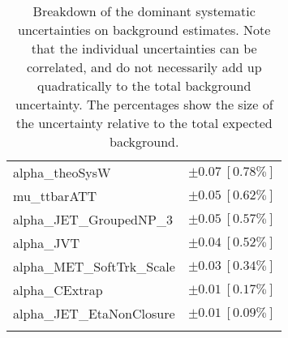\begin{table}
\begin{center}
\begin{tabular*}{\textwidth}{@{\extracolsep{\fill}}lc}
alpha\_theoSysW         & $\pm 0.07\ [0.78\%] $       \\
mu\_ttbarATT         & $\pm 0.05\ [0.62\%] $       \\
alpha\_JET\_GroupedNP\_3         & $\pm 0.05\ [0.57\%] $       \\
alpha\_JVT         & $\pm 0.04\ [0.52\%] $       \\
alpha\_MET\_SoftTrk\_Scale         & $\pm 0.03\ [0.34\%] $       \\
alpha\_CExtrap         & $\pm 0.01\ [0.17\%] $       \\
alpha\_JET\_EtaNonClosure         & $\pm 0.01\ [0.09\%] $       \\
\noalign{\smallskip}\hline\noalign{\smallskip}
\end{tabular*}
\end{center}
\caption[Breakdown of uncertainty on background estimates]{
Breakdown of the dominant systematic uncertainties on background estimates.
Note that the individual uncertainties can be correlated, and do not necessarily add up quadratically to 
the total background uncertainty. The percentages show the size of the uncertainty relative to the total expected background.
\label{table.results.bkgestimate.uncertainties.SRA_TT}}
\end{table}
%
